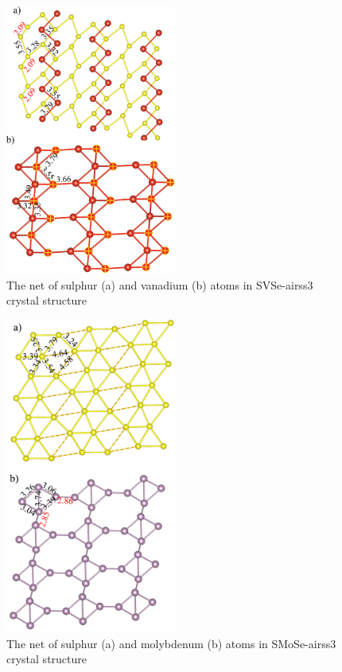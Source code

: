 \documentclass[a4paperm]{article}
\begin{document}
\begin{figure}[H]
	\includegraphics[width=0.5\textwidth]{airss3_svse.png}
	\caption{The net of sulphur (a) and vanadium (b) atoms in SVSe-airss3 crystal structure}
	\label{airss3_svse}
\end{figure}

\begin{figure}[H]
	\includegraphics[width=0.5\textwidth]{airss3_smose.png}
	\caption{The net of sulphur (a) and molybdenum (b) atoms in SMoSe-airss3 crystal structure}
	\label{airss3_smose}
\end{figure}
\end{document}
